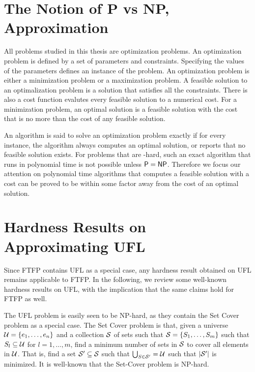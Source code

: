 \documentclass[oneside,final]{ucr}
\begin{document}
\section{The Notion of P vs NP, Approximation}
All problems studied in this thesis are optimization
problems. An optimization problem is defined by a set of
parameters and constraints. Specifying the values of the
parameters defines an instance of the problem. An
optimization problem is either a minimization problem or a
maximization problem. A feasible solution to an
optimalization problem is a solution that satisfies all the
constraints. There is also a cost function evalutes every
feasible solution to a numerical cost. For a minimization
problem, an optimal solution is a feasible solution with the
cost that is no more than the cost of any feasible solution.

An algorithm is said to solve an optimization problem
exactly if for every instance, the algorithm always computes
an optimal solution, or reports that no feasible solution
exists. For problems that are \NP-hard, such an exact
algorithm that runs in polynomial time is not possible
unless ${\mbox{\sf P}} = {\mbox{\sf NP}}$. Therefore we focus our attention on
polynomial time algorithms that computes a feasible solution
with a cost can be proved to be within some factor away from
the cost of an optimal solution.

\section{Hardness Results on Approximating UFL}
\label{sec:hardness}

Since FTFP contains UFL as a special case, any hardness
result obtained on UFL remains applicable to FTFP. In the
following, we review some well-known hardness results on
UFL, with the implication that the same claims hold for FTFP
as well.

The UFL problem is easily seen to be NP-hard, as they
contain the Set Cover problem as a special case. The Set
Cover problem is that, given a universe $\calU = \{e_1,
\ldots, e_n\}$ and a collection $\calS$ of sets such that
$\calS = \{S_1, \ldots, S_m\}$ such that $S_l \subseteq
\calU$ for $l=1,\ldots,m$, find a minimum number of sets in
$\calS$ to cover all elements in $\calU$. That is, find a
set $\calS' \subseteq \calS$ such that $\bigcup_{S\in
  \calS'} = \calU$ such that $|\calS'|$ is minimized. It is
well-known that the Set-Cover problem is NP-hard.
\end{document}
